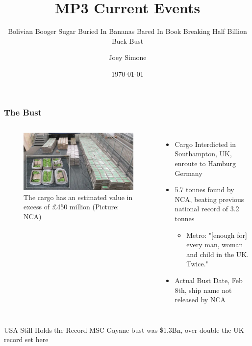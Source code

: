 \documentclass{beamer}
\subtitle{Bolivian Booger Sugar Buried In Bananas Bared In Book Breaking Half Billion Buck Bust}
\title{MP3 Current Events}
\author{Joey Simone}
\institute{Cal Maritime}
\date{\today}
\begin{document}
\begin{frame}
    \maketitle
\end{frame}
\begin{frame}
\frametitle{The Bust}
\begin{columns}
\begin{figure}
    \centering
    \includegraphics[width=\textwidth, height=.5\textwidth, keepaspectratio]{ezgif-5-53840fb83b.jpg}
\caption{The cargo has an estimated value in excess of £450 million (Picture: NCA)}
    \label{fig:1}
\end{figure}

\begin{itemize}
    \item Cargo Interdicted in Southampton, UK, enroute to Hamburg Germany
    \item 5.7 tonnes found by NCA, beating previous national record of 3.2 tonnes
    \begin{itemize}
        \item Metro: "[enough for] every man, woman and child in the UK. Twice."
    \end{itemize}
    \item Actual Bust Date, Feb 8th, ship name not released by NCA
\end{itemize}
\end{columns}
\begin{block}{USA Still Holds the Record}
MSC Gayane bust was \$1.3Bn, over double the UK record set here
\end{block}
\end{frame}
\end{document}
